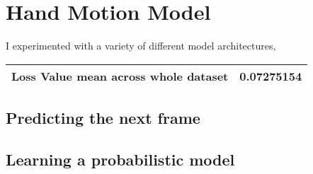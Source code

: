 \chapter{Hand Motion Model}
\label{C:hand-model}


I experimented with a variety of different model architectures,


\begin{tabular}{ | c | c |}
    \hline
    Loss Value mean across whole dataset & 0.07275154 \\
    \hline
\end{tabular}


\section{Predicting the next frame}
\label{S:mean-model}


\section{Learning a probabilistic model}
\label{S:prob-model}

